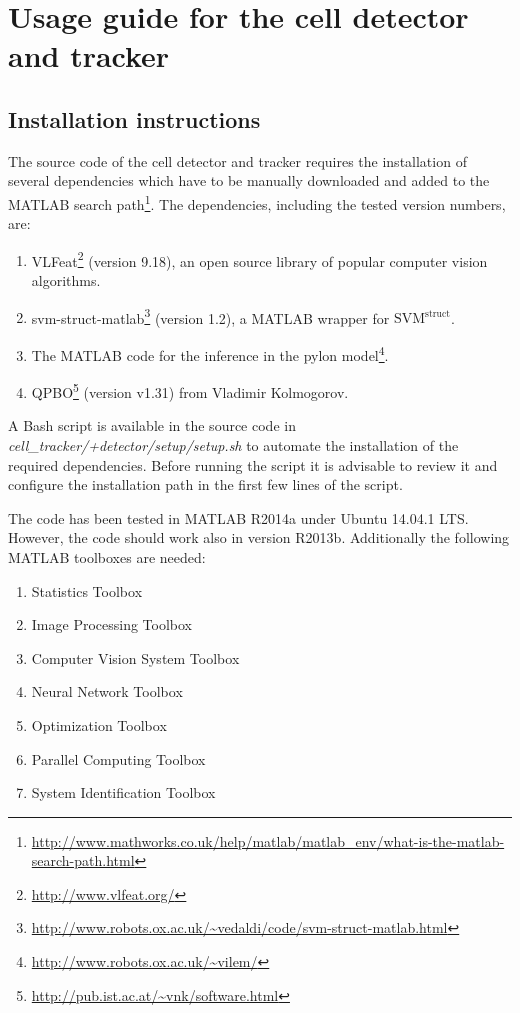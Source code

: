 \chapter{Usage guide for the cell detector and tracker}
	\label{app:detectiontracking}
	
	\section{Installation instructions}
	The source code of the cell detector and tracker requires the installation of several dependencies which have to be manually downloaded and added to the MATLAB search path\footnote{\url{http://www.mathworks.co.uk/help/matlab/matlab_env/what-is-the-matlab-search-path.html}}. The dependencies, including the tested version numbers, are:
	
	\begin{enumerate}
	\item {VLFeat}\footnote{\url{http://www.vlfeat.org/}} (version 9.18), an open source library of popular computer vision algorithms.
	\item {svm-struct-matlab}\footnote{\url{http://www.robots.ox.ac.uk/\~vedaldi/code/svm-struct-matlab.html}} (version 1.2), a MATLAB wrapper for $\text{SVM}^\text{struct}$.
	\item The MATLAB code for the inference in the pylon model\footnote{\url{http://www.robots.ox.ac.uk/\~vilem/}}.
	\item {QPBO}\footnote{\url{http://pub.ist.ac.at/\~vnk/software.html}} (version v1.31) from Vladimir Kolmogorov.
	\end{enumerate}
	
	A Bash script is available in the source code in \textit{cell\_tracker/+detector/setup/setup.sh} to automate the installation of the required dependencies. Before running the script it is advisable to review it and configure the installation path in the first few lines of the script.	
	
	The code has been tested in MATLAB R2014a under Ubuntu 14.04.1 LTS. However, the code should work also in version R2013b. Additionally the following MATLAB toolboxes are needed:
	
	\begin{enumerate}
	\item Statistics Toolbox
	\item Image Processing Toolbox
	\item Computer Vision System Toolbox
	\item Neural Network Toolbox
	\item Optimization Toolbox
	\item Parallel Computing Toolbox
	\item System Identification Toolbox
	\end{enumerate}
	
